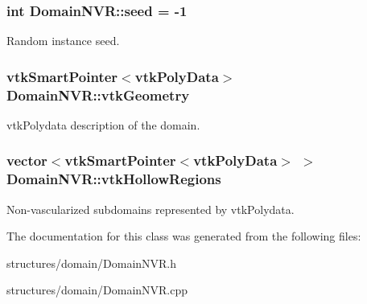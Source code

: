 \subsubsection[{\texorpdfstring{seed}{seed}}]{\setlength{\rightskip}{0pt plus 5cm}int Domain\+N\+V\+R\+::seed = -\/1\hspace{0.3cm}{\ttfamily [private]}}\hypertarget{class_domain_n_v_r_aaf470f5f729cb3fc68d5449c52eccde5}{}\label{class_domain_n_v_r_aaf470f5f729cb3fc68d5449c52eccde5}
Random instance seed. 
\subsubsection[{\texorpdfstring{vtk\+Geometry}{vtkGeometry}}]{\setlength{\rightskip}{0pt plus 5cm}vtk\+Smart\+Pointer$<$vtk\+Poly\+Data$>$ Domain\+N\+V\+R\+::vtk\+Geometry\hspace{0.3cm}{\ttfamily [private]}}\hypertarget{class_domain_n_v_r_a4870df18eb5b742c6a76ad9ba04533a2}{}\label{class_domain_n_v_r_a4870df18eb5b742c6a76ad9ba04533a2}
vtk\+Polydata description of the domain. 
\subsubsection[{\texorpdfstring{vtk\+Hollow\+Regions}{vtkHollowRegions}}]{\setlength{\rightskip}{0pt plus 5cm}vector$<$vtk\+Smart\+Pointer$<$vtk\+Poly\+Data$>$ $>$ Domain\+N\+V\+R\+::vtk\+Hollow\+Regions\hspace{0.3cm}{\ttfamily [private]}}\hypertarget{class_domain_n_v_r_aff487471a8d4fc7b0a5cfeeb119f8471}{}\label{class_domain_n_v_r_aff487471a8d4fc7b0a5cfeeb119f8471}
Non-\/vascularized subdomains represented by vtk\+Polydata. 

The documentation for this class was generated from the following files\+:\begin{DoxyCompactItemize}
\item 
structures/domain/Domain\+N\+V\+R.\+h\item 
structures/domain/Domain\+N\+V\+R.\+cpp\end{DoxyCompactItemize}
